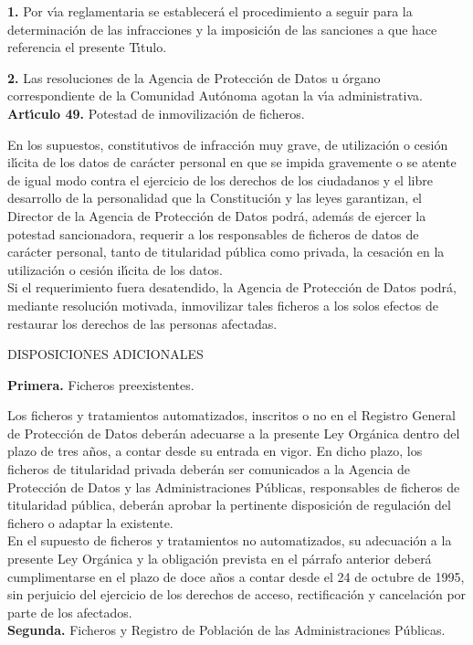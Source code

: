 {\bf 1.} Por v\'{\i}a reglamentaria se establecer\'a el procedimiento
a seguir para la determinaci\'on de las infracciones y la imposici\'on
de las sanciones a que hace referencia el presente T\'{\i}tulo.

{\bf 2.} Las resoluciones de la Agencia de Protecci\'on de Datos u
\'organo correspondiente de la Comunidad Aut\'onoma agotan la v\'{\i}a
administrativa.
\vspace{0.3cm}\\
{\large {\bf Art\'{\i}culo 49.} Potestad de inmovilizaci\'on de ficheros.}

En los supuestos, constitutivos de infracci\'on muy grave, de
utilizaci\'on o cesi\'on il\'{\i}cita de los datos de car\'acter
personal en que se impida gravemente o se atente de igual modo contra el
ejercicio de los derechos de los ciudadanos y el libre desarrollo de la
personalidad que la Constituci\'on y las leyes garantizan, el Director
de la Agencia de Protecci\'on de Datos podr\'a, adem\'as de ejercer la
potestad sancionadora, requerir a los responsables de ficheros de datos
de car\'acter personal, tanto de titularidad p\'ublica como privada, la
cesaci\'on en la utilizaci\'on o cesi\'on il\'{\i}cita de los datos.\\
Si el requerimiento fuera desatendido, la Agencia de Protecci\'on de
Datos podr\'a, mediante resoluci\'on motivada, inmovilizar tales ficheros
a los solos
efectos de restaurar los derechos de las personas afectadas.
\begin{center}
{\LARGE DISPOSICIONES ADICIONALES}
\end{center}
\vspace{0.3cm} {\large {\bf Primera.} Ficheros preexistentes.}

Los ficheros y tratamientos automatizados, inscritos o no en el Registro 
General de Protecci\'on de Datos deber\'an adecuarse a la presente Ley 
Org\'anica dentro del plazo de tres a\~nos, a contar desde su entrada en vigor. 
En dicho plazo, los ficheros de titularidad privada deber\'an ser comunicados a 
la Agencia de Protecci\'on de Datos y las Administraciones P\'ublicas, 
responsables de ficheros de titularidad p\'ublica, deber\'an aprobar la 
pertinente disposici\'on de regulaci\'on del fichero o adaptar la existente.\\

En el supuesto de ficheros y tratamientos no automatizados, su adecuaci\'on a 
la presente Ley Org\'anica y la obligaci\'on prevista en el p\'arrafo anterior 
deber\'a cumplimentarse en el plazo de doce a\~nos a contar desde el 24 de 
octubre de 1995, sin perjuicio del ejercicio de los derechos de acceso, 
rectificaci\'on y cancelaci\'on por parte de los afectados.
\vspace{0.3cm}\\
{\large {\bf Segunda.} Ficheros y Registro de Poblaci\'on de las 
Administraciones P\'ublicas.}

